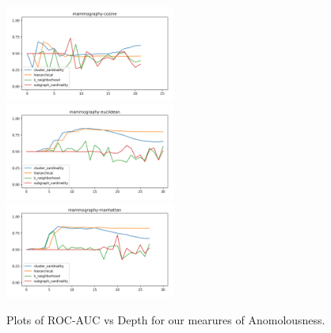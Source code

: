 \begin{figure}[!t]
\includegraphics[width=2.2in]{kdd/static/auc_vs_depth/mammography-cosine.png}
\includegraphics[width=2.2in]{kdd/static/auc_vs_depth/mammography-euclidean.png}
\includegraphics[width=2.2in]{kdd/static/auc_vs_depth/mammography-manhattan.png}

\caption{
Plots of ROC-AUC vs Depth for our mearures of Anomolousness.
}

\label{results:datasets_4}
\end{figure}

